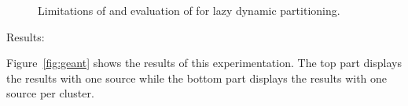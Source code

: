 \begin{asparadesc}
\begin{figure}
  \hspace{5pt}
  \caption{Limitations of \NAME and evaluation of \NAMEC for lazy dynamic partitioning.}
\end{figure}



\item [Results:]

Figure~\ref{fig:geant} shows the results of this experimentation. The
top part displays the results with one source while the bottom part
displays the results with one source per cluster.


\end{asparadesc}
